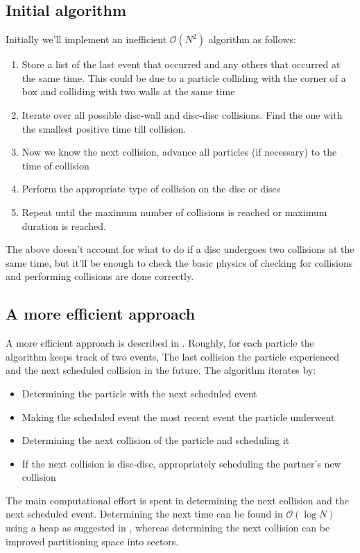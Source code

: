 \documentclass{article}
\begin{document}
\subsection{Initial algorithm}
Initially we'll implement an inefficient $\mathcal{O}(N^2)$ algorithm as follows:
\begin{enumerate}
    \item Store a list of the last event that occurred and any others that occurred at the same time. This could be due to a particle colliding with the corner of a box and colliding with two walls at the same time
    \item Iterate over all possible disc-wall and disc-disc collisions. Find the one with the smallest positive time till collision.
    \item Now we know the next collision, advance all particles (if necessary) to the time of collision
    \item Perform the appropriate type of collision on the disc or discs
    \item Repeat until the maximum number of collisions is reached or maximum duration is reached.
\end{enumerate}
The above doesn't account for what to do if a disc undergoes two collisions at the same time, but it'll be enough to check the basic physics of checking for collisions and performing collisions are done correctly.

\subsection{A more efficient approach}
A more efficient approach is described in \cite{Lubachevsky-1991}. Roughly, for each particle the algorithm keeps track of two events, The last collision the particle experienced and the next scheduled collision in the future. The algorithm iterates by:
\begin{itemize}
    \item Determining the particle with the next scheduled event
    \item Making the scheduled event the most recent event the particle underwent 
    \item Determining the next collision of the particle and scheduling it
    \item If the next collision is disc-disc, appropriately scheduling the partner's new collision
\end{itemize}
The main computational effort is spent in determining the next collision and the next scheduled event. Determining the next time can be found in $\mathcal{O}(\log N)$ using a heap as suggested in \cite{Lubachevsky-1991}, whereas determining the next collision can be improved partitioning space into sectors.
\end{document}
